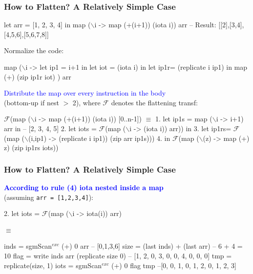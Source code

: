 \documentclass{beamer}
\newcommand{\blue}[1]{\textcolor{Blue}{{#1}}}
\renewcommand{\emph}[1]{\textcolor{structure}{#1}}
\newcommand{\emp}[1]{\textcolor{DikuRed}{ #1}}
\newcommand{\mymath}[1]{$ #1 $}
\newcommand{\myindu}[1]{^{#1}}
\begin{document}
\begin{frame}[fragile]
	\tableofcontents[currentsubsection]
\end{frame}


\begin{frame}[fragile,t]
  \frametitle{How to Flatten? A Relatively Simple Case}
\begin{colorcode}
let arr = [1, 2, 3, 4] in
\alert{map (\mymath{\backslash}i -> map (+(i+1)) (iota i)) arr}
-- Result: [[2],[3,4],[4,5,6],[5,6,7,8]]
\end{colorcode}
\bigskip
\pause

Normalize the code:
\begin{colorcode}
map (\mymath{\backslash}i -> let ip1 = i+1 in
           let iot = (iota i) in
           let ip1r= (replicate i ip1) in
           map (+) (zip ip1r iot)            ) arr
\end{colorcode}
\bigskip

\blue{Distribute the map over every instruction in the body}\\
(bottom-up if nest $>$ 2), where $\mathcal{F}$ denotes the flattening transf:
\bigskip
\pause

\begin{colorcode}
\mymath{\mathcal{F}}(\alert{map (\mymath{\backslash}i -> map (+(i+1)) (iota i)) [0..n-1]}) \mymath{\equiv}
1. let ip1s = map (\mymath{\backslash}i -> i+1) arr in -- [2, 3, 4, 5]
2. let iots = \mymath{\mathcal{F}}(map (\mymath{\backslash}i -> (iota i)) arr)) in
3. let ip1rs= \mymath{\mathcal{F}}(map (\mymath{\backslash}(i,ip1) -> (replicate i ip1)) (zip arr ip1s)))
4. in  \mymath{\mathcal{F}}(map (\mymath{\backslash}(z) -> map (+) z) (zip ip1rs iots))
\end{colorcode}

\end{frame}



\begin{frame}[fragile,t]
  \frametitle{How to Flatten? A Relatively Simple Case}

\blue{\bf According to rule (4) iota nested inside a map}\\
(assuming {\tt arr = [1,2,3,4]}):
\bigskip

\begin{colorcode}
2. let iots = \mymath{\mathcal{F}}(map (\mymath{\backslash}i -> iota(i)) arr)

\mymath{\equiv}

inds = sgmScan\mymath{\myindu{exc}} (+) 0 arr -- [0,1,3,6]
size = (last inds) + (last arr) -- 6 + 4 = 10
flag = write inds arr 
             (replicate size 0)
--           [1, 2, 0, 3, 0, 0, 4, 0, 0, 0]
tmp  = replicate(size, 1)
iots = sgmScan\mymath{\myindu{exc}} (+) 0 flag \emp{tmp} \emph{--[0, 0, 1, 0, 1, 2, 0, 1, 2, 3]}
\end{colorcode}

\end{frame}
\end{document}
